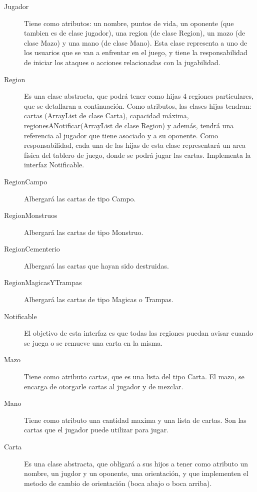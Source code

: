 \begin{description}

\item[Jugador] Tiene como atributos: un nombre, puntos de vida, un oponente (que tambien es de clase jugador), una region (de clase Region), un mazo (de clase Mazo) y una mano (de clase Mano). Esta clase representa a uno de los usuarios que se van a enfrentar en el juego, y tiene la responsabilidad de iniciar los ataques o acciones relacionadas con la jugabilidad.

\item[Region] Es una clase abstracta, que podrá tener como hijas 4 regiones particulares, que se detallaran a continuación. Como atributos, las clases hijas tendran: cartas (ArrayList de clase Carta), capacidad máxima, regionesANotificar(ArrayList de clase Region) y además, tendrá una referencia al jugador que tiene asociado y a su oponente. Como responsabilidad, cada una de las hijas de esta clase representará un area física del tablero de juego, donde se podrá jugar las cartas. Implementa la interfaz Notificable.

\item[RegionCampo] Albergará las cartas de tipo Campo.

\item[RegionMonstruos] Albergará las cartas de tipo Monstruo.

\item[RegionCementerio] Albergará las cartas que hayan sido destruidas.

\item[RegionMagicasYTrampas] Albergará las cartas de tipo Magicas o Trampas.

\item[Notificable] El objetivo de esta interfaz es que todas las regiones puedan avisar cuando se juega o se remueve una carta en la misma.

\item[Mazo] Tiene como atributo cartas, que es una lista del tipo Carta. El mazo, se encarga de otorgarle cartas al jugador y de mezclar.

\item[Mano] Tiene como atributo una cantidad maxima y una lista de cartas. Son las cartas que el jugador puede utilizar para jugar.

\item[Carta] Es una clase abstracta, que obligará a sus hijos a tener como atributo un nombre, un jugdor y un oponente, una orientación,  y que implementen el metodo de cambio de orientación (boca abajo o boca arriba).


\end{description}
